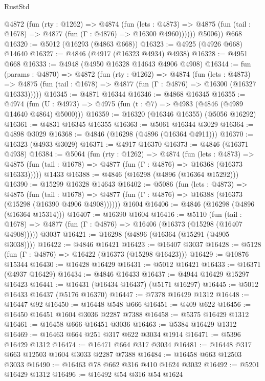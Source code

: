 \begin{lexlean}{RustStd}
\begin{coremodule}
          @4872
            (fun (rty : @1262) =>
            @4874
              (fun (lets : @4873) =>
              @4875 (fun (tail : @1678) => @4877 (fun (Γ : @4876) => @16300 @4960))))))
        @5006))
    @668
@16320 := @5012 (@16293 (@4863 @668))
@16323 := @4925 (@4926 @668) @14640
@16327 := @4846 (@4917 (@16323 @4934) @4938)
@16328 := @4951 @668
@16333 := @4948 (@4950 @16328 @14643 @4906 @4908)
@16344 := fun (params : @4870) =>
  @4872
    (fun (rty : @1262) =>
    @4874
      (fun (lets : @4873) =>
      @4875 (fun (tail : @1678) => @4877 (fun (Γ : @4876) => @16300 (@16327 @16333)))))
@16345 := @4871 @16344
@16346 := @4868 @16345
@16355 := @4974
    (fun (U : @4973) => @4975 (fun (t : @7) => @4983 (@4846 (@4989 @14640 @4864) @5000)))
@16359 := @16320 (@16346 @16355) (@5056 @16292)
@16361 := @4831 @16345 @16355
@16363 := @5061 @16344 @3029
@16364 := @4898 @3029
@16368 := @4846 (@16298 (@4896 (@16364 @4911)))
@16370 := @16323 (@4933 @3029)
@16371 := @4917 @16370
@16373 := @4846 (@16371 @4938)
@16384 := @5064
    (fun (rty : @1262) =>
    @4874
      (fun (lets : @4873) =>
      @4875 (fun (tail : @1678) => @4877 (fun (Γ : @4876) => @16368 (@16373 @16333)))))
    @1433
@16388 := @4846 (@16298 (@4896 (@16364 @15292)))
@16390 := @15299 @16328 @14643
@16402 := @5086
    (fun (lets : @4873) =>
    @4875
      (fun (tail : @1678) =>
      @4877 (fun (Γ : @4876) => @16388 (@16373 (@15298 (@16390 @4906 @4908))))))
    @1604
@16406 := @4846 (@16298 (@4896 (@16364 @15314)))
@16407 := @16390 @1604
@16416 := @5110
    (fun (tail : @1678) => @4877 (fun (Γ : @4876) => @16406 (@16373 (@15298 (@16407 @4908)))))
    @3037
@16421 := @16298 (@4896 (@16364 (@15291 (@4905 @3038))))
@16422 := @4846 @16421
@16423 := @16407 @3037
@16428 := @5128 (fun (Γ : @4876) => @16422 (@16373 (@15298 @16423)))
@16429 := @10876 @15344
@16430 := @16428 @16429
@16431 := @5012 @16421
@16433 := @16371 (@4937 @16429)
@16434 := @4846 @16433
@16437 := @4944 @16429 @15297 @16423
@16441 := @16431 (@16434 @16437) (@5171 @16297)
@16445 := @5012 @16433 @16437 (@5176 @16370)
@16447 := @7378 @16429 @1312
@16448 := @16447 @92
@16450 := @16448 @548 @666
@16451 := @409 @622
@16456 := @16450 @16451 @1604 @3036 @2287 @7388
@16458 := @5375 @16429 @1312
@16461 := @16458 @666 @16451 @3036
@16463 := @5384 @16429 @1312
@16469 := @16463 @664 @251 @317 @622 @3034 @1914
@16471 := @5396 @16429 @1312
@16474 := @16471 @664 @317 @3034
@16481 := @16448 @317 @663 @12503 @1604 @3033 @2287 @7388
@16484 := @16458 @663 @12503 @3033
@16490 := @16463 @78 @662 @316 @410 @1624 @3032
@16492 := @5201 @16429 @1312
@16496 := @16492 @54 @316 @54 @1624

\end{coremodule}
\end{lexlean}
